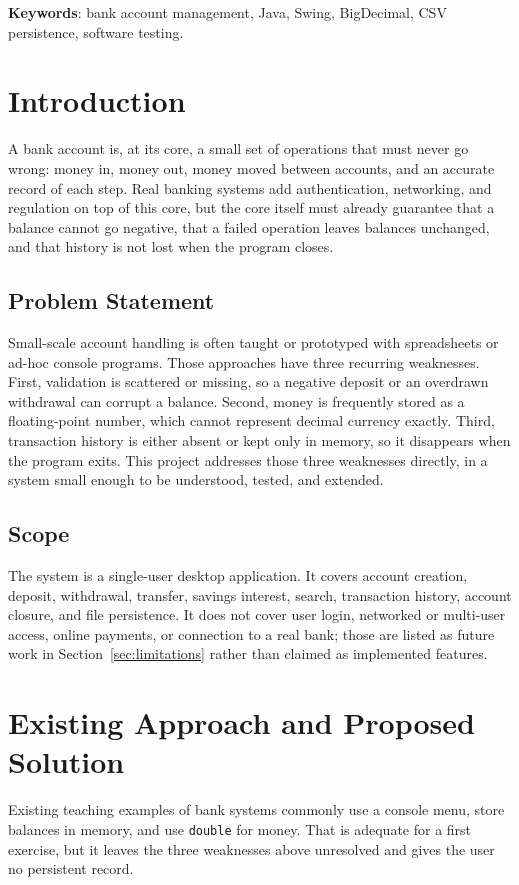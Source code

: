 \documentclass[11pt,a4paper]{report}
\begin{document}
\textbf{Keywords}: bank account management, Java, Swing, BigDecimal, CSV persistence, software testing.

\section{Introduction}
A bank account is, at its core, a small set of operations that must never go wrong: money in, money out, money moved between accounts, and an accurate record of each step. Real banking systems add authentication, networking, and regulation on top of this core, but the core itself must already guarantee that a balance cannot go negative, that a failed operation leaves balances unchanged, and that history is not lost when the program closes.

\subsection{Problem Statement}
Small-scale account handling is often taught or prototyped with spreadsheets or ad-hoc console programs. Those approaches have three recurring weaknesses. First, validation is scattered or missing, so a negative deposit or an overdrawn withdrawal can corrupt a balance. Second, money is frequently stored as a floating-point number, which cannot represent decimal currency exactly. Third, transaction history is either absent or kept only in memory, so it disappears when the program exits. This project addresses those three weaknesses directly, in a system small enough to be understood, tested, and extended.

\subsection{Scope}
The system is a single-user desktop application. It covers account creation, deposit, withdrawal, transfer, savings interest, search, transaction history, account closure, and file persistence. It does not cover user login, networked or multi-user access, online payments, or connection to a real bank; those are listed as future work in Section~\ref{sec:limitations} rather than claimed as implemented features.

\section{Existing Approach and Proposed Solution}
Existing teaching examples of bank systems commonly use a console menu, store balances in memory, and use \texttt{double} for money. That is adequate for a first exercise, but it leaves the three weaknesses above unresolved and gives the user no persistent record.
\end{document}
